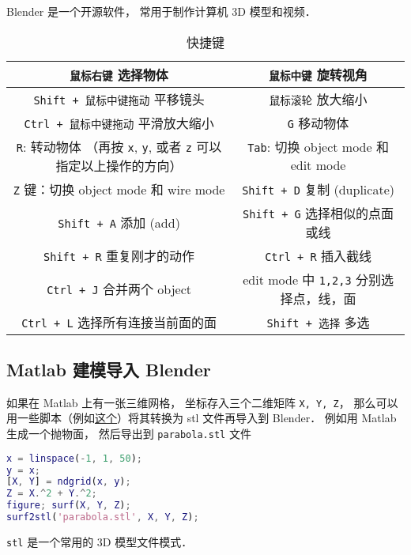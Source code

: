 
\begin{issues}
\issueDraft
\end{issues}

Blender 是一个开源软件， 常用于制作计算机 3D 模型和视频．

\begin{table}[ht]
\centering
\caption{快捷键}\label{Blendr_tab1}
\begin{tabular}{|c|c|}
\hline
\verb|鼠标右键| 选择物体 & \verb|鼠标中键| 旋转视角 \\
\hline
\verb|Shift + 鼠标中键拖动| 平移镜头 & \verb|鼠标滚轮| 放大缩小 \\
\hline
\verb|Ctrl + 鼠标中键拖动| 平滑放大缩小 & \verb|G| 移动物体 \\
\hline
\verb|R|: 转动物体 （再按 \verb|x|, \verb|y|, 或者 \verb|z| 可以指定以上操作的方向） & \verb|Tab|: 切换 object mode 和 edit mode \\
\hline
\verb|Z| 键：切换 object mode 和 wire mode & \verb|Shift + D| 复制 (duplicate) \\
\hline
\verb|Shift + A| 添加 (add) & \verb|Shift + G| 选择相似的点面或线 \\
\hline
\verb|Shift + R| 重复刚才的动作 & \verb|Ctrl + R| 插入截线 \\
\hline
\verb|Ctrl + J| 合并两个 object & edit mode 中 \verb|1,2,3| 分别选择点，线，面\\
\hline
\verb|Ctrl + L| 选择所有连接当前面的面 & \verb|Shift + 选择| 多选
\end{tabular}
\end{table}


\subsection{Matlab 建模导入 Blender}
如果在 Matlab 上有一张三维网格， 坐标存入三个二维矩阵 \verb|X, Y, Z|， 那么可以用一些脚本（例如\href{https://www.mathworks.com/matlabcentral/fileexchange/4512-surf2stl}{这个}）将其转换为 stl 文件再导入到 Blender． 例如用 Matlab 生成一个抛物面， 然后导出到 \verb|parabola.stl| 文件
\begin{lstlisting}[language=matlab]
x = linspace(-1, 1, 50);
y = x;
[X, Y] = ndgrid(x, y);
Z = X.^2 + Y.^2;
figure; surf(X, Y, Z);
surf2stl('parabola.stl', X, Y, Z);
\end{lstlisting}
\verb|stl| 是一个常用的 3D 模型文件模式．
